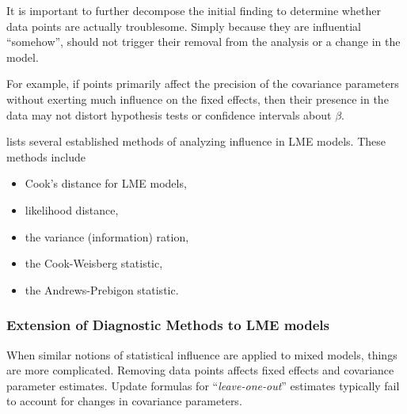 \documentclass[12pt, a4paper]{report}
\theoremstyle{plain}
\theoremstyle{definition}
\theoremstyle{remark}
\begin{document}
	It is important to further decompose the initial finding to determine whether data points are actually troublesome. Simply because they are influential “somehow”, should not trigger their removal from the analysis or a change in the model. 
	
	
	For example, if points primarily affect the precision of the covariance parameters without exerting much influence on the fixed effects, then their presence in the data may not distort hypothesis
	tests or confidence intervals about $\beta$.
	
	
	
	
	
	
	\citet{Zewotir} lists several established methods of analyzing influence in LME models. These methods include \begin{itemize}
		\item Cook's distance for LME models,
		\item {} likelihood distance,
		\item the variance (information) ration,
		\item the  Cook-Weisberg statistic,
		\item the  Andrews-Prebigon statistic.
	\end{itemize}
	
	
	
	

	
	
	\subsubsection{Extension of Diagnostic Methods to LME models}
	
	
	
	When similar notions of statistical influence are applied to mixed models,
	things are more complicated. Removing data points affects fixed effects and covariance parameter estimates.
	Update formulas for “\textit{leave-one-out}” estimates typically fail to account for changes in covariance
	parameters. 
	
\end{document}
